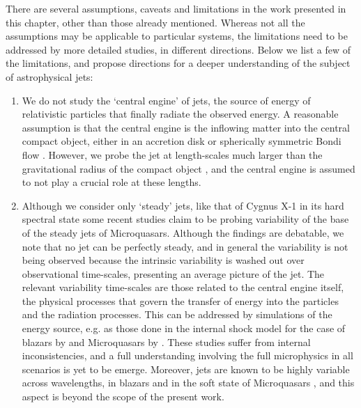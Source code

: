 There are several assumptions, caveats and limitations in the work presented in this chapter, other than those already mentioned. Whereas not all the assumptions may be applicable to particular systems, the limitations need to be addressed by more detailed studies, in different directions. Below we list a few of the limitations, and propose directions for a deeper understanding of the subject of astrophysical jets:

\begin{enumerate}
\item We do not study the `central engine' of jets, the source of energy of relativistic particles that finally radiate the observed energy. A reasonable assumption is that the central engine is the inflowing matter into the central compact object, either in an accretion disk \citep{Shakura_&_Sunayev-1973-AAp} or spherically symmetric Bondi flow \citep{Bondi-1952-MNRAS}. However, we probe the jet at length-scales much larger than the gravitational radius of the compact object , and the central engine is assumed to not play a crucial role at these lengths.

\item Although we consider only `steady' jets, like that of Cygnus X-1 in its hard spectral state  some recent studies \citep{Gandhi_et_al.-2011-ApJ} claim to be probing variability of the base of the steady jets of Microquasars. Although the findings are debatable, we note that no jet can be perfectly steady, and in general the variability is not being observed because the intrinsic variability is washed out over observational time-scales, presenting an average picture of the jet. The relevant variability time-scales are those related to the central engine itself, the physical processes that govern the transfer of energy into the particles and the radiation processes. This can be addressed by simulations of the energy source, e.g. as those done in the internal shock model for the case of blazars by \cite{Joshi_&_Bottcher-2007-ApJ} and Microquasars by \cite{Jamil_et_al.-2010-MNRAS}. These studies suffer from internal inconsistencies, and a full understanding involving the full microphysics in all scenarios is yet to be emerge. Moreover, jets are known to be highly variable across wavelengths, in blazars \citep{Kushwaha_et_al.-2013-MNRAS, Agarwal_et_al.-2015-MNRAS, Agarwal_et_al.-2016-MNRAS} and in the soft state of Microquasars \citep{Mirabel_&_Rodriguez-1994-Nature}, and this aspect is beyond the scope of the present work.


\end{enumerate}
